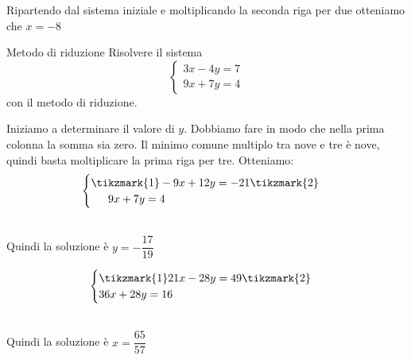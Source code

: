 Ripartendo dal sistema iniziale e moltiplicando la seconda riga per due otteniamo che $x=-8$
\begin{esempiot} {Metodo di riduzione}{}
	Risolvere il sistema \[
	\begin{cases}
	3x-4y=7\\
	9x+7y=4
	\end{cases}\]
con il metodo di riduzione.
\end{esempiot}
Iniziamo a determinare il valore di $y$. Dobbiamo fare in modo che nella prima colonna la somma sia zero. Il minimo comune multiplo tra nove e tre  è nove, quindi basta moltiplicare la prima riga per tre. Otteniamo:
\newpage
\[
\begin{cases}
\tikzmark{1}-9x+12y=-21\tikzmark{2}\\
\phantom{++}9x+7y=4
\end{cases}\]
\\
 Quindi la soluzione è $y=-\dfrac{17}{19}$
 
\[
\begin{cases}
\tikzmark{1}21x-28y=49\tikzmark{2}\\
36x+28y=16
\end{cases}\]
\\ 

Quindi la soluzione è $x=\dfrac{65}{57}$

